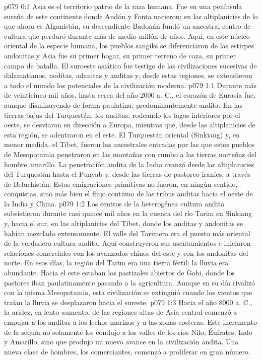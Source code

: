 \author{Arcángel}
\vs p079 0:1 Asia es el territorio patrio de la raza humana. Fue en una península sureña de este continente donde Andón y Fonta nacieron; en las altiplanicies de lo que ahora es Afganistán, su descendiente Badonán fundó un ancestral centro de cultura que perduró durante más de medio millón de años. Aquí, en este núcleo oriental de la especie humana, los pueblos sangiks se diferenciaron de las estirpes andonitas y Asia fue su primer hogar, su primer terreno de caza, su primer campo de batalla. El suroeste asiático fue testigo de las civilizaciones sucesivas de dalamatianos, noditas, adanitas y anditas y, desde estas regiones, se extendieron a todo el mundo los potenciales de la civilización moderna.
\vs p079 1:1 Durante más de veinticinco mil años, hasta cerca del año 2000 a. C., el corazón de Eurasia fue, aunque disminuyendo de forma paulatina, predominantemente andita. En las tierras bajas del Turquestán, los anditas, rodeando los lagos interiores por el oeste, se desviaron en dirección a Europa, mientras que, desde las altiplanicies de esta región, se adentraron en el este. El Turquestán oriental (Sinkiang) y, en menor medida, el Tíbet, fueron las ancestrales entradas por las que estos pueblos de Mesopotamia penetraron en las montañas con rumbo a las tierras norteñas del hombre amarillo. La penetración andita de la India avanzó desde las altiplanicies del Turquestán hasta el Punyab y, desde las tierras de pastoreo iraníes, a través de Beluchistán. Estas emigraciones primitivas no fueron, en ningún sentido, conquistas, sino más bien el flujo continuo de las tribus anditas hacia el oeste de la India y China.
\vs p079 1:2 \pc Los centros de la heterogénea cultura andita subsistieron durante casi quince mil años en la cuenca del río Tarim en Sinkiang y, hacia el sur, en las altiplanicies del Tíbet, donde los anditas y andonitas se habían mezclado extensamente. El valle del Tarimera era el puesto más oriental de la verdadera cultura andita. Aquí construyeron sus asentamientos e iniciaron relaciones comerciales con los avanzados chinos del este y con los andonitas del norte. En esos días, la región del Tarim era una tierra fértil; la lluvia era abundante. Hacia el este estaban los pastizales abiertos de Gobi, donde los pastores iban paulatinamente pasando a la agricultura. Aunque en su día rivalizó con la misma Mesopotamia, esta civilización se extinguió cuando los vientos que traían la lluvia se desplazaron hacia el sureste.
\vs p079 1:3 \pc Hacia el año 8000 a. C., la aridez, en lento aumento, de las regiones altas de Asia central comenzó a empujar a los anditas a los lechos marinos y a las zonas costeras. Este incremento de la sequía no solamente los condujo a los valles de los ríos Nilo, Éufrates, Indo y Amarillo, sino que produjo un nuevo avance en la civilización andita. Una nueva clase de hombres, los comerciantes, comenzó a proliferar en gran número.
